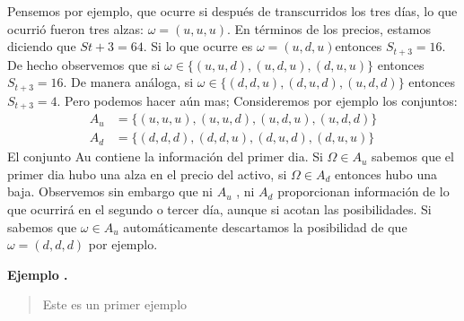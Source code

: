 \documentclass[14pt]{extreport}
\newcounter{ejemplo}[chapter] %
\newenvironment{ejemplo}{%
  \refstepcounter{ejemplo}%
  \textbf{Ejemplo \theexample.}
  \begin{quote}%
}{%
  \end{quote}%
  \medskip
}
\begin{document}
Pensemos por ejemplo, que ocurre si después de transcurridos los tres días, lo que ocurrió fueron tres alzas: $\omega = (u,
u, u)$. En términos de los precios, estamos diciendo que $St+3 = 64$. Si lo que ocurre es $\omega = (u, d, u )$entonces $S_{t+3} = 16$. De hecho observemos que
si $\omega \in \{(u, u, d), (u, d, u), (d, u, u)\}$ entonces $S_{t+3} = 16$. De manera
análoga, si $\omega \in \{(d, d, u), (d, u, d), (u, d, d)\}$ entonces $S_{t+3} = 4$.
Pero podemos hacer aún mas; Consideremos por ejemplo los conjuntos: 
\begin{equation*}
	\begin{split}
		A_u & = \{(u, u, u), (u, u, d), (u, d, u), (u, d, d)\} \\
      A_d & = \{(d, d, d), (d, d,u), (d, u, d), (d, u, u)\} 
	\end{split}
\end{equation*}
El conjunto Au contiene la información del primer dia. Si $\Omega \in A_u$ sabemos que el primer dia hubo una alza en el precio del activo, si $\Omega \in A_d$ entonces hubo una baja. Observemos sin embargo que ni $A_u$ , ni $A_d$ proporcionan información de lo que ocurrirá en el segundo o tercer día, aunque si acotan las posibilidades. Si sabemos que $\omega \in A_u$ automáticamente descartamos la posibilidad de que $\omega = (d, d,
d)$ por ejemplo. 

\begin{ejemplo}
	Este es un primer ejemplo
\end{ejemplo}
\end{document}
